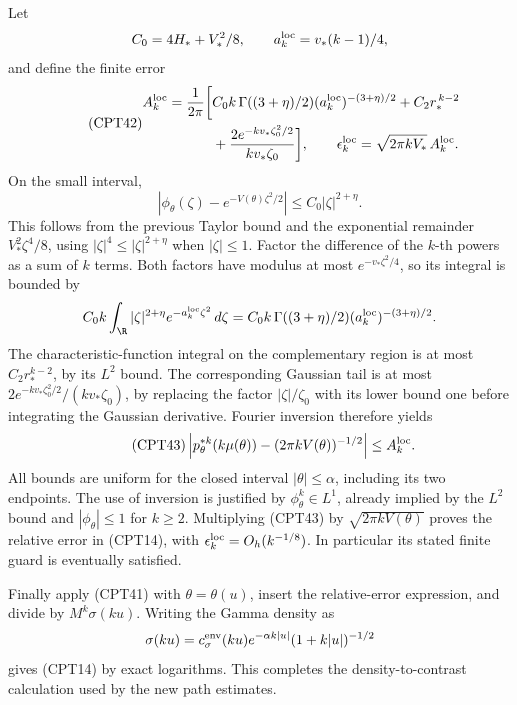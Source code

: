 Let
\[
 C_0=4H_*+V_*^2/8,\qquad a_k^{\rm loc}=v_*(k-1)/4,
\]
and define the finite error
\begin{equation}\tag{CPT42}
\begin{split}
 A_k^{\rm loc}=\frac1{2\pi}\bigg[
 &C_0k\,\Gamma((3+\eta)/2)
                    (a_k^{\rm loc})^{-(3+\eta)/2}
 +C_2r_*^{\,k-2}\\
 &+\frac{2e^{-kv_*\zeta_0^2/2}}{kv_*\zeta_0}
 \bigg],\qquad
 \epsilon_k^{\rm loc}=\sqrt{2\pi kV_*}\,A_k^{\rm loc}.
\end{split}
\end{equation}
On the small interval,
\[
 |\phi_\theta(\zeta)-e^{-V(\theta)\zeta^2/2}|
 \le C_0|\zeta|^{2+\eta}.
\]
This follows from the previous Taylor bound and the exponential
remainder \(V_*^2\zeta^4/8\), using
\(|\zeta|^4\le|\zeta|^{2+\eta}\) when \(|\zeta|\le1\).
Factor the difference of the \(k\)-th powers as a sum of \(k\)
terms.  Both factors have modulus at most
\(e^{-v_*\zeta^2/4}\), so its integral is bounded by
\[
 C_0k\int_\R|\zeta|^{2+\eta}
             e^{-a_k^{\rm loc}\zeta^2}\,d\zeta
 =C_0k\,\Gamma((3+\eta)/2)
                      (a_k^{\rm loc})^{-(3+\eta)/2}.
\]
The characteristic-function integral on the complementary
region is at most \(C_2r_*^{k-2}\), by its \(L^2\) bound.
The corresponding Gaussian tail is at most
\(2e^{-kv_*\zeta_0^2/2}/(kv_*\zeta_0)\), by replacing
the factor \(|\zeta|/\zeta_0\) with its lower bound one
before integrating the Gaussian derivative.
Fourier inversion therefore yields
\begin{equation}\tag{CPT43}
 \left|p_\theta^{*k}(k\mu(\theta))
           -(2\pi kV(\theta))^{-1/2}\right|
 \le A_k^{\rm loc}.
\end{equation}
All bounds are uniform for the closed interval
\(|\theta|\le\alpha\), including its two endpoints.
The use of inversion is justified by
\(\phi_\theta^k\in L^1\), already implied by the \(L^2\)
bound and \(|\phi_\theta|\le1\) for \(k\ge2\).
Multiplying (CPT43) by \(\sqrt{2\pi kV(\theta)}\) proves
the relative error in (CPT14), with
\(\epsilon_k^{\rm loc}=O_h(k^{-1/8})\).
In particular its stated finite guard is eventually satisfied.

Finally apply (CPT41) with \(\theta=\theta(u)\),
insert the relative-error expression, and divide by
\(M^k\sigma(ku)\).  Writing the Gamma density as
\[
 \sigma(ku)=c_{\sigma}^{\rm env}(ku)
                 e^{-\alpha k|u|}(1+k|u|)^{-1/2}
\]
gives (CPT14) by exact logarithms.
This completes the density-to-contrast calculation used by
the new path estimates.



